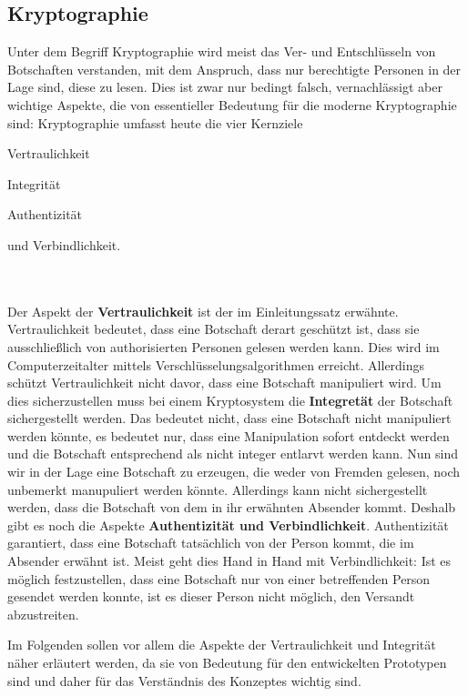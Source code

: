 \documentclass[13pt,a4paper,bibliography=totocnumbered,listof=totocnumbered]{scrartcl}
\begin{document}
\subsection{Kryptographie}\label{KryptV}
Unter dem Begriff Kryptographie wird meist das Ver- und Entschlüsseln von Botschaften verstanden, mit dem Anspruch, dass nur berechtigte Personen in der Lage sind, diese zu lesen. Dies ist zwar nur bedingt falsch, vernachlässigt aber wichtige Aspekte, die von essentieller Bedeutung für die moderne Kryptographie sind: Kryptographie umfasst heute die vier Kernziele
\begin{compactitem}
	\item Vertraulichkeit
	\item Integrität
	\item Authentizität
	\item und Verbindlichkeit.
\end{compactitem}
\cite[S. 14-17]{48} \cite[S. 2]{42}\\\\
Der Aspekt der \textbf{Vertraulichkeit} ist der im Einleitungssatz erwähnte. Vertraulichkeit bedeutet, dass eine Botschaft derart geschützt ist, dass sie ausschließlich von authorisierten Personen gelesen werden kann. Dies wird im Computerzeitalter mittels Verschlüsselungsalgorithmen erreicht. Allerdings schützt Vertraulichkeit nicht davor, dass eine Botschaft manipuliert wird. Um dies sicherzustellen muss bei einem Kryptosystem die \textbf{Integretät} der Botschaft sichergestellt werden. Das bedeutet nicht, dass eine Botschaft nicht manipuliert werden könnte, es bedeutet nur, dass eine Manipulation sofort entdeckt werden und die Botschaft entsprechend als nicht integer entlarvt werden kann. Nun sind wir in der Lage eine Botschaft zu erzeugen, die weder von Fremden gelesen, noch unbemerkt manupuliert werden könnte. Allerdings kann nicht sichergestellt werden, dass die Botschaft von dem in ihr erwähnten Absender kommt. Deshalb gibt es noch die Aspekte \textbf{Authentizität und Verbindlichkeit}. Authentizität garantiert, dass eine Botschaft tatsächlich von der Person kommt, die im Absender erwähnt ist. Meist geht dies Hand in Hand mit Verbindlichkeit: Ist es möglich festzustellen, dass eine Botschaft nur von einer betreffenden Person gesendet werden konnte, ist es dieser Person nicht möglich, den Versandt abzustreiten.\\
 \cite[S. 2]{42} \cite[S. 14-17]{48}

Im Folgenden sollen vor allem die Aspekte der Vertraulichkeit und Integrität näher erläutert werden, da sie von Bedeutung für den entwickelten Prototypen sind und daher für das Verständnis des Konzeptes wichtig sind.
\end{document}
